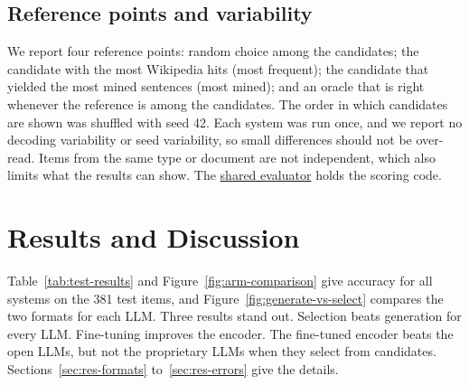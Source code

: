 \documentclass[11pt]{article}
\newcommand{\codebase}[2]{\href{https://github.com/BenCarmel123/hebrew-acronym-disambiguation/blob/04ec31754421e4a96d6b66122cb0a2fca428471d/#1}{#2}}
\begin{document}
\subsection{Reference points and variability}
We report four reference points: random choice among the candidates; the candidate with the most Wikipedia hits (most frequent); the candidate that yielded the most mined sentences (most mined); and an oracle that is right whenever the reference is among the candidates. The order in which candidates are shown was shuffled with seed 42. Each system was run once, and we report no decoding variability or seed variability, so small differences should not be over-read. Items from the same type or document are not independent, which also limits what the results can show. The \codebase{src/hebrew_acronyms/models/common/eval.py}{shared evaluator} holds the scoring code.

\section{Results and Discussion}
\label{sec:results}
Table~\ref{tab:test-results} and Figure~\ref{fig:arm-comparison} give accuracy for all systems on the 381 test items, and Figure~\ref{fig:generate-vs-select} compares the two formats for each LLM. Three results stand out. Selection beats generation for every LLM. Fine-tuning improves the encoder. The fine-tuned encoder beats the open LLMs, but not the proprietary LLMs when they select from candidates. Sections~\ref{sec:res-formats} to~\ref{sec:res-errors} give the details.
\end{document}

